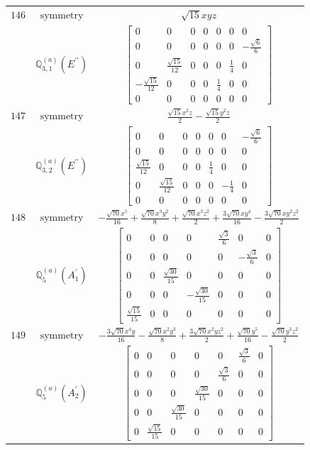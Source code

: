 \documentclass[fleqn,8pt,landscape]{jsarticle}
\begin{document}
\begin{longtable}{ccc}
$ 146 $ & $ \text{symmetry} $ & $ \sqrt{15} x y z $ \\
$  $ & $ \mathbb{Q}_{3,1}^{(a)}(E^{\prime\prime}) $ & $ \begin{bmatrix} 0 & 0 & 0 & 0 & 0 & 0 & 0 \\ 0 & 0 & 0 & 0 & 0 & 0 & - \frac{\sqrt{6}}{6} \\ 0 & \frac{\sqrt{15}}{12} & 0 & 0 & 0 & \frac{1}{4} & 0 \\ - \frac{\sqrt{15}}{12} & 0 & 0 & 0 & \frac{1}{4} & 0 & 0 \\ 0 & 0 & 0 & 0 & 0 & 0 & 0 \end{bmatrix} $ \\ \hline
$ 147 $ & $ \text{symmetry} $ & $ \frac{\sqrt{15} x^{2} z}{2} - \frac{\sqrt{15} y^{2} z}{2} $ \\
$  $ & $ \mathbb{Q}_{3,2}^{(a)}(E^{\prime\prime}) $ & $ \begin{bmatrix} 0 & 0 & 0 & 0 & 0 & 0 & - \frac{\sqrt{6}}{6} \\ 0 & 0 & 0 & 0 & 0 & 0 & 0 \\ \frac{\sqrt{15}}{12} & 0 & 0 & 0 & \frac{1}{4} & 0 & 0 \\ 0 & \frac{\sqrt{15}}{12} & 0 & 0 & 0 & - \frac{1}{4} & 0 \\ 0 & 0 & 0 & 0 & 0 & 0 & 0 \end{bmatrix} $ \\ \hline
$ 148 $ & $ \text{symmetry} $ & $ - \frac{\sqrt{70} x^{5}}{16} + \frac{\sqrt{70} x^{3} y^{2}}{8} + \frac{\sqrt{70} x^{3} z^{2}}{2} + \frac{3 \sqrt{70} x y^{4}}{16} - \frac{3 \sqrt{70} x y^{2} z^{2}}{2} $ \\
$  $ & $ \mathbb{Q}_{5}^{(a)}(A_{1}^{\prime}) $ & $ \begin{bmatrix} 0 & 0 & 0 & 0 & \frac{\sqrt{3}}{6} & 0 & 0 \\ 0 & 0 & 0 & 0 & 0 & - \frac{\sqrt{3}}{6} & 0 \\ 0 & 0 & \frac{\sqrt{30}}{15} & 0 & 0 & 0 & 0 \\ 0 & 0 & 0 & - \frac{\sqrt{30}}{15} & 0 & 0 & 0 \\ \frac{\sqrt{15}}{15} & 0 & 0 & 0 & 0 & 0 & 0 \end{bmatrix} $ \\ \hline
$ 149 $ & $ \text{symmetry} $ & $ - \frac{3 \sqrt{70} x^{4} y}{16} - \frac{\sqrt{70} x^{2} y^{3}}{8} + \frac{3 \sqrt{70} x^{2} y z^{2}}{2} + \frac{\sqrt{70} y^{5}}{16} - \frac{\sqrt{70} y^{3} z^{2}}{2} $ \\
$  $ & $ \mathbb{Q}_{5}^{(a)}(A_{2}^{\prime}) $ & $ \begin{bmatrix} 0 & 0 & 0 & 0 & 0 & \frac{\sqrt{3}}{6} & 0 \\ 0 & 0 & 0 & 0 & \frac{\sqrt{3}}{6} & 0 & 0 \\ 0 & 0 & 0 & \frac{\sqrt{30}}{15} & 0 & 0 & 0 \\ 0 & 0 & \frac{\sqrt{30}}{15} & 0 & 0 & 0 & 0 \\ 0 & \frac{\sqrt{15}}{15} & 0 & 0 & 0 & 0 & 0 \end{bmatrix} $ \\ \hline

\end{longtable}
\end{document}
